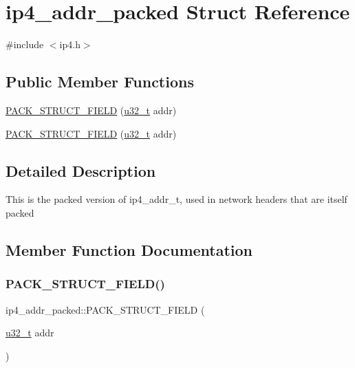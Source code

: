 \hypertarget{structip4__addr__packed}{}\section{ip4\+\_\+addr\+\_\+packed Struct Reference}
\label{structip4__addr__packed}


{\ttfamily \#include $<$ip4.\+h$>$}

\subsection*{Public Member Functions}
\begin{DoxyCompactItemize}
\item 
\hyperlink{structip4__addr__packed_a829ac9d684c84b953bd111251ea037a6}{P\+A\+C\+K\+\_\+\+S\+T\+R\+U\+C\+T\+\_\+\+F\+I\+E\+LD} (\hyperlink{group__compiler__abstraction_ga4c14294869aceba3ef9d4c0c302d0f33}{u32\+\_\+t} addr)
\item 
\hyperlink{structip4__addr__packed_a829ac9d684c84b953bd111251ea037a6}{P\+A\+C\+K\+\_\+\+S\+T\+R\+U\+C\+T\+\_\+\+F\+I\+E\+LD} (\hyperlink{group__compiler__abstraction_ga4c14294869aceba3ef9d4c0c302d0f33}{u32\+\_\+t} addr)
\end{DoxyCompactItemize}


\subsection{Detailed Description}
This is the packed version of ip4\+\_\+addr\+\_\+t, used in network headers that are itself packed 

\subsection{Member Function Documentation}
\mbox{\label{structip4__addr__packed_a829ac9d684c84b953bd111251ea037a6}} 
\subsubsection{\texorpdfstring{P\+A\+C\+K\+\_\+\+S\+T\+R\+U\+C\+T\+\_\+\+F\+I\+E\+L\+D()}{PACK\_STRUCT\_FIELD()}\hspace{0.1cm}{\footnotesize\ttfamily [1/2]}}
{\footnotesize\ttfamily ip4\+\_\+addr\+\_\+packed\+::\+P\+A\+C\+K\+\_\+\+S\+T\+R\+U\+C\+T\+\_\+\+F\+I\+E\+LD (\begin{DoxyParamCaption}\item[{\hyperlink{group__compiler__abstraction_ga4c14294869aceba3ef9d4c0c302d0f33}{u32\+\_\+t}}]{addr }\end{DoxyParamCaption})}

